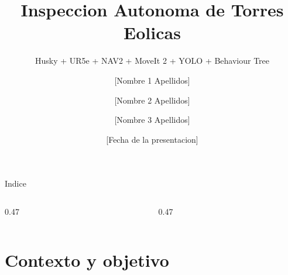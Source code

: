 \documentclass[10pt,aspectratio=169]{beamer}
\title{Inspeccion Autonoma de Torres Eolicas}
\subtitle{Husky + UR5e + NAV2 + MoveIt 2 + YOLO + Behaviour Tree}
\author[Equipo P1 P2 P3]{%
  [Nombre 1 Apellidos] \and
  [Nombre 2 Apellidos] \and
  [Nombre 3 Apellidos]
}
\institute[Loyola]{Universidad Loyola Andalucia \\ Master en Inteligencia Artificial \\ Robotica Inteligente}
\date{[Fecha de la presentacion]}
\begin{document}
{
\begin{frame}[plain]
  \titlepage
\end{frame}}

\begin{frame}{Indice}
  \toprightlogo
  \vfill
  \begin{center}
    \begin{minipage}{0.86\textwidth}
      \begin{columns}[t,onlytextwidth]
        \begin{column}{0.47\textwidth}
          \footnotesize
          \tableofcontents[hideallsubsections,sections={1-5}]
        \end{column}
        \begin{column}{0.47\textwidth}
          \footnotesize
          \tableofcontents[hideallsubsections,sections={6-10}]
        \end{column}
      \end{columns}
    \end{minipage}
  \end{center}
  \vfill
\end{frame}

\section{Contexto y objetivo}
\end{document}
